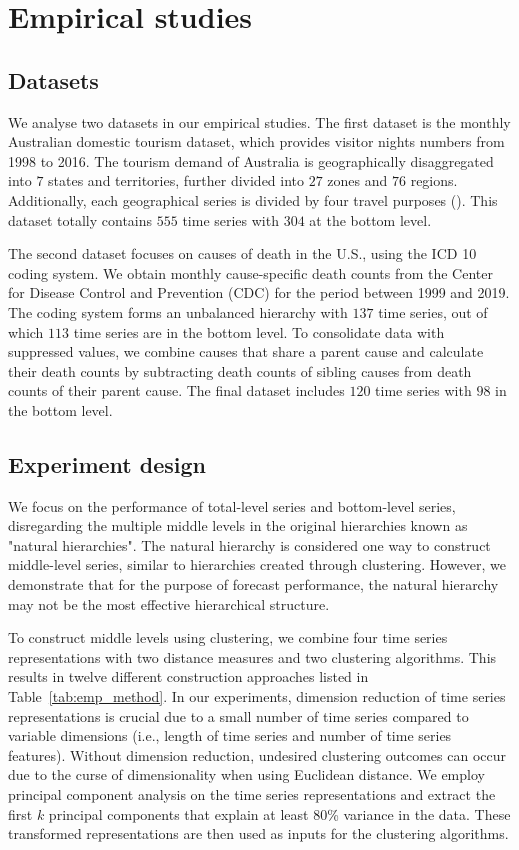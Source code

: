 \documentclass[a4paper,review,12pt,authoryear]{elsarticle}
\begin{document}
\section{Empirical studies}

\subsection{Datasets}

We analyse two datasets in our empirical studies. The first dataset is the monthly Australian domestic tourism dataset, which provides visitor nights numbers from 1998 to 2016. The tourism demand of Australia is geographically disaggregated into $7$ states and territories, further divided into $27$ zones and $76$ regions. Additionally, each geographical series is divided by four travel purposes (\citealp{wickramasuriyaOptimalForecastReconciliation2019}). This dataset totally contains $555$ time series with $304$ at the bottom level.

The second dataset focuses on causes of death in the U.S., using the ICD 10 coding system. We obtain monthly cause-specific death counts from the Center for Disease Control and Prevention (CDC) for the period between 1999 and 2019. The coding system forms an unbalanced hierarchy with $137$ time series, out of which $113$ time series are in the bottom level. To consolidate data with suppressed values, we combine causes that share a parent cause and calculate their death counts by subtracting death counts of sibling causes from death counts of their parent cause. The final dataset includes $120$ time series with $98$ in the bottom level.

\subsection{Experiment design}

We focus on the performance of total-level series and bottom-level series, disregarding the multiple middle levels in the original hierarchies known as "natural hierarchies". The natural hierarchy is considered one way to construct middle-level series, similar to hierarchies created through clustering. However, we demonstrate that for the purpose of forecast performance, the natural hierarchy may not be the most effective hierarchical structure.

To construct middle levels using clustering, we combine four time series representations with two distance measures and two clustering algorithms. This results in twelve different construction approaches listed in Table~\ref{tab:emp_method}. In our experiments, dimension reduction of time series representations is crucial due to a small number of time series compared to variable dimensions (i.e., length of time series and number of time series features). Without dimension reduction, undesired clustering outcomes can occur due to the curse of dimensionality when using Euclidean distance. We employ principal component analysis on the time series representations and extract the first $k$ principal components that explain at least 80\% variance in the data. These transformed representations are then used as inputs for the clustering algorithms.
\end{document}
